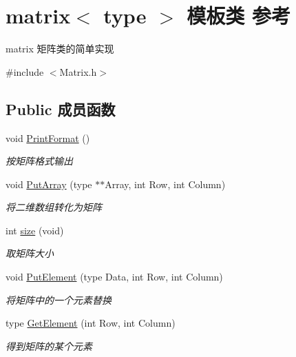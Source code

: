 \hypertarget{classmatrix}{}\section{matrix$<$ type $>$ 模板类 参考}
\label{classmatrix}


matrix 矩阵类的简单实现  




{\ttfamily \#include $<$Matrix.\+h$>$}

\subsection*{Public 成员函数}
\begin{DoxyCompactItemize}
\item 
\mbox{\label{classmatrix_a1536b75646af71d28be7247a3f0ee16f}} 
void \mbox{\hyperlink{classmatrix_a1536b75646af71d28be7247a3f0ee16f}{Print\+Format}} ()
\begin{DoxyCompactList}\small\item\em 按矩阵格式输出 \end{DoxyCompactList}\item 
void \mbox{\hyperlink{classmatrix_a7f2bec444e35753d7225daf48e04e677}{Put\+Array}} (type $\ast$$\ast$Array, int Row, int Column)
\begin{DoxyCompactList}\small\item\em 将二维数组转化为矩阵 \end{DoxyCompactList}\item 
int \mbox{\hyperlink{classmatrix_a0650c9aa35a3a11b3cf155ce674dddac}{size}} (void)
\begin{DoxyCompactList}\small\item\em 取矩阵大小 \end{DoxyCompactList}\item 
void \mbox{\hyperlink{classmatrix_a483f7ab8c7d5aa28495fb5d9a02d369d}{Put\+Element}} (type Data, int Row, int Column)
\begin{DoxyCompactList}\small\item\em 将矩阵中的一个元素替换 \end{DoxyCompactList}\item 
type \mbox{\hyperlink{classmatrix_a24b3678b5a1b638006fc8fe0fd9cc457}{Get\+Element}} (int Row, int Column)
\begin{DoxyCompactList}\small\item\em 得到矩阵的某个元素 \end{DoxyCompactList}\item 
$$
\end{DoxyCompactItemize}
